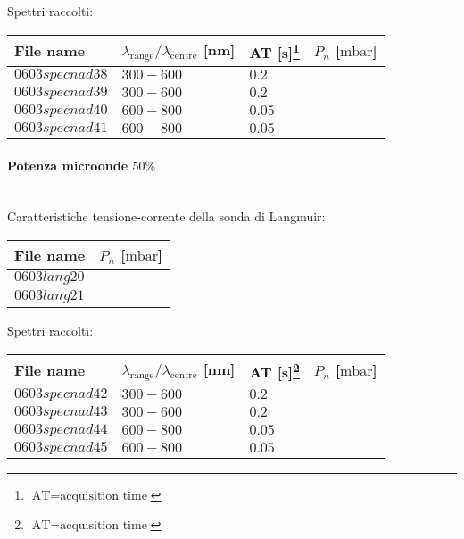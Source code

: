 Spettri raccolti:
\begin{center}
\begin{tabular}{p{3cm}p{4cm}p{2cm}p{3cm}}
\toprule
File name	&$\lambda_\text{range}\text{/}\lambda_\text{centre}$ [nm] 	&AT [s]\footnote{$\text{AT}=\text{acquisition time}$} &$P_n$ [$\si{\milli\bar}$]\\
\midrule
$0603specnad38$	&$300-600$	&$0.2$		&$  $\\
$0603specnad39$	&$300-600$	&$0.2$		&$  $\\
$0603specnad40$	&$600-800$	&$0.05$		&$  $\\
$0603specnad41$	&$600-800$	&$0.05$		&$  $\\

\bottomrule
\end{tabular}
\end{center}

\paragraph*{Potenza microonde $\text{50\%}$} ~\\
Caratteristiche tensione-corrente della sonda di Langmuir:
\begin{center}
\begin{tabular}{p{3cm}p{3cm}}
\toprule
File name	&$P_n$ [$\si{\milli\bar}$]\\
\midrule
$0603lang20$	&$  $\\
$0603lang21$	&$  $\\
\bottomrule
\end{tabular}
\end{center}

Spettri raccolti:
\begin{center}
\begin{tabular}{p{3cm}p{4cm}p{2cm}p{3cm}}
\toprule
File name	&$\lambda_\text{range}\text{/}\lambda_\text{centre}$ [nm] 	&AT [s]\footnote{$\text{AT}=\text{acquisition time}$} &$P_n$ [$\si{\milli\bar}$]\\
\midrule
$0603specnad42$	&$300-600$	&$0.2$		&$  $\\
$0603specnad43$	&$300-600$	&$0.2$		&$  $\\
$0603specnad44$	&$600-800$	&$0.05$		&$  $\\
$0603specnad45$	&$600-800$	&$0.05$		&$  $\\

\end{tabular}
\end{center}

